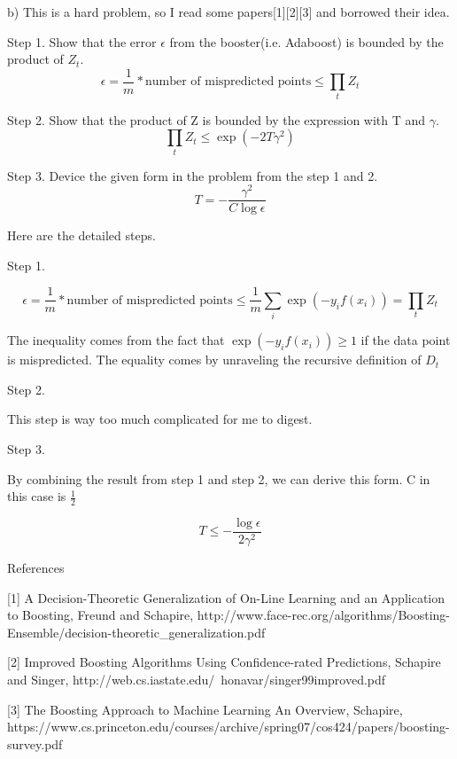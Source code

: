\documentclass[11pt]{article}
\theoremstyle{definition}
\begin{document}
\bigskip
b)
This is a hard problem, so I read some papers[1][2][3] and borrowed their idea.

Step 1. Show that the error $\epsilon$ from the booster(i.e. Adaboost) is bounded by the product of $Z_t$.
\begin{equation*}
\epsilon = \frac{1}{m} * {\text{number of mispredicted points}} \le \prod_{t} Z_t
\end{equation*}

Step 2. Show that the product of Z is bounded by the expression with T and $\gamma$.
\begin{equation*}
\prod_{t} Z_t \le \exp(-2T\gamma^2)
\end{equation*}

Step 3. Device the given form in the problem from the step 1 and 2.
\begin{equation*}
T = - \frac{\gamma^2}{C\log \epsilon}
\end{equation*}

\bigskip
Here are the detailed steps.

Step 1.

\begin{equation*}
\epsilon = \frac{1}{m} * {\text{number of mispredicted points}} \le 
\frac{1}{m} \sum_{i} \exp(-y_if(x_i)) =
\prod_{t} Z_t
\end{equation*}

The inequality comes from the fact that $\exp(-y_if(x_i)) \ge 1$ if the data point is mispredicted. The equality comes by unraveling the recursive definition of $D_t$

Step 2.

This step is way too much complicated for me to digest.

Step 3.

By combining the result from step 1 and step 2, we can derive this form.
C in this case is $\frac{1}{2}$

\begin{equation*}
T \le - \frac {\log \epsilon}{2\gamma^2}
\end{equation*}

\bigskip
References

[1] A Decision-Theoretic Generalization of On-Line Learning and an Application to Boosting, Freund and Schapire, 
http://www.face-rec.org/algorithms/Boosting-Ensemble/decision-theoretic_generalization.pdf

[2] Improved Boosting Algorithms
Using Confidence-rated Predictions, Schapire and Singer, http://web.cs.iastate.edu/~honavar/singer99improved.pdf

[3] The Boosting Approach to Machine Learning An Overview, Schapire, https://www.cs.princeton.edu/courses/archive/spring07/cos424/papers/boosting-survey.pdf
\end{document}
